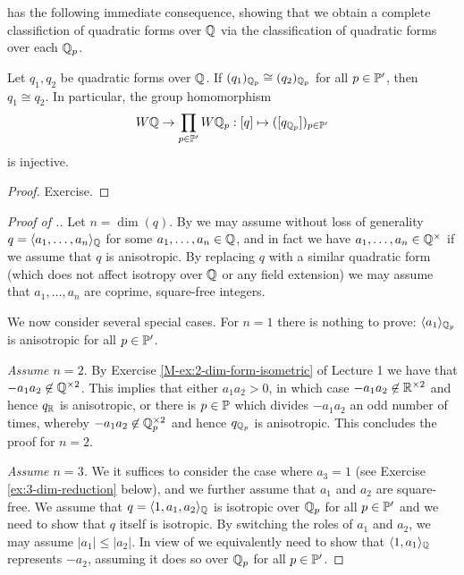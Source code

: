 \documentclass[12pt, leqno, british]{amsart}
\begin{document}
 has the following immediate consequence, showing that we obtain a complete classifiction of quadratic forms over $\mathbb Q$ via the classification of quadratic forms over each $\mathbb Q_p$.
\begin{cor}\label{C:Hasse-Minkowski}
Let $q_1, q_2$ be quadratic forms over $\mathbb Q$.
If $(q_1)_{\mathbb Q_p} \cong (q_2)_{\mathbb Q_p}$ for all $p \in \mathbb P'$, then $q_1 \cong q_2$.
In particular, the group homomorphism
$$ W\mathbb Q \to \prod_{p \in \mathbb P'} W\mathbb Q_p : [q] \mapsto ([q_{\mathbb Q_p}])_{p \in \mathbb P'}$$
is injective.
\end{cor}
\begin{proof}
Exercise.
\end{proof}
\begin{proof}[Proof of .]
Let $n = \dim(q)$.
By  we may assume without loss of generality $q = \langle a_1, \ldots, a_n \rangle_\mathbb Q$ for some $a_1, \ldots, a_n \in \mathbb Q$, and in fact we have $a_1, \ldots, a_n \in \mathbb Q^\times$ if we assume that $q$ is anisotropic.
By replacing $q$ with a similar quadratic form (which does not affect isotropy over $\mathbb Q$ or any field extension) we may assume that $a_1, \ldots, a_n$ are coprime, square-free integers.

We now consider several special cases.
For $n=1$ there is nothing to prove: $\langle a_1 \rangle_{\mathbb Q_p}$ is anisotropic for all $p \in \mathbb P'$.

\emph{Assume $n=2$}.
By Exercise \eqref{M-ex:2-dim-form-isometric} of Lecture 1 we have that $-a_1a_2 \not\in \mathbb Q^{\times 2}$.
This implies that either $a_1a_2 > 0$, in which case $-a_1a_2 \not\in \mathbb R^{\times 2}$ and hence $q_\mathbb R$ is anisotropic, or there is $p \in \mathbb P$ which divides $-a_1a_2$ an odd number of times, whereby $-a_1a_2 \not\in \mathbb Q_p^{\times 2}$ and hence $q_{\mathbb Q_p}$ is anisotropic.
This concludes the proof for $n = 2$.

\emph{Assume $n = 3$.}
We it suffices to consider the case where $a_3 = 1$ (see Exercise \eqref{ex:3-dim-reduction} below), and we further assume that $a_1$ and $a_2$ are square-free.
We assume that $q = \langle 1, a_1, a_2 \rangle_{\mathbb Q}$ is isotropic over $\mathbb Q_p$ for all $p \in \mathbb P'$ and we need to show that $q$ itself is isotropic.
By switching the roles of $a_1$ and $a_2$, we may assume $\lvert a_1 \rvert \leq \lvert a_2 \rvert$.
In view of  we equivalently need to show that $\langle 1, a_1 \rangle_{\mathbb Q}$ represents $-a_2$, assuming it does so over $\mathbb Q_p$ for all $p \in \mathbb P'$.


\end{proof}
\end{document}
